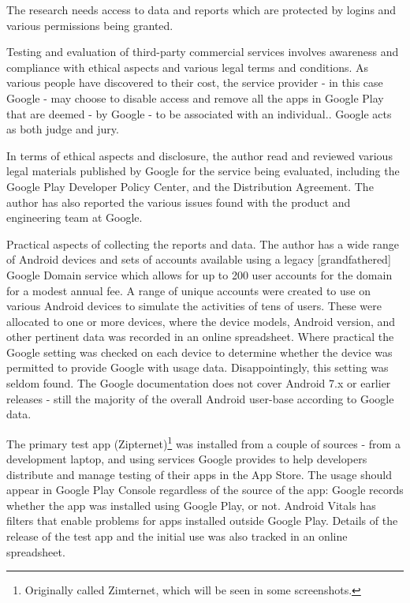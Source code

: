 The research needs access to data and reports which are protected by logins and various permissions being granted. 

Testing and evaluation of third-party commercial services involves awareness and compliance with ethical aspects and various legal terms and conditions. As various people have discovered to their cost, the service provider - in this case Google - may choose to disable access and remove all the apps in Google Play that are deemed - by Google - to be associated with an individual.\cite{Martinez_2019}. Google acts as both judge and jury.

In terms of ethical aspects and disclosure, the author read and reviewed various legal materials published by Google for the service being evaluated, including the Google Play Developer Policy Center\cite{google_play_developer_policy_center}, and the Distribution Agreement\cite{google_play_developer_distribution_agreement}. The author has also reported the various issues found with the product and engineering team at Google.

Practical aspects of collecting the reports and data. The author has a wide range of Android devices and sets of accounts available using a legacy [grandfathered] Google Domain service which allows for up to 200 user accounts for the domain for a modest annual fee. A range of unique accounts were created to use on various Android devices to simulate the activities of tens of users. These were allocated to one or more devices, where the device models, Android version, and other pertinent data was recorded in an online spreadsheet. Where practical the Google setting was checked on each device to determine whether the device was permitted to provide Google with usage data. Disappointingly, this setting was seldom found. The Google documentation does not cover Android 7.x or earlier releases - still the majority of the overall Android user-base according to Google data\cite{android_dashboard}. 

The primary test app (Zipternet)\footnote{Originally called Zimternet, which will be seen in some screenshots.} was installed from a couple of sources - from a development laptop, and using services Google provides to help developers distribute and manage testing of their apps in the App Store. The usage should appear in Google Play Console regardless of the source of the app: Google records whether the app was installed using Google Play, or not. Android Vitals has filters that enable problems for apps installed outside Google Play. Details of the release of the test app and the initial use was also tracked in an online spreadsheet. 

